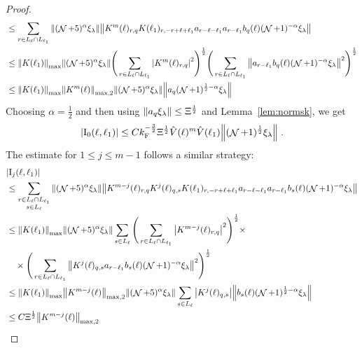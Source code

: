 \documentclass[12pt,a4paper]{article}
\numberwithin{equation}{section}
\newcommand{\1}{\mathbb{I}}
\newcommand{\F}{\mathrm{F}}
\newcommand{\I}{\mathrm{I}}
\DeclareMathOperator{\NN}{\mathcal{N}}
\newcommand{\half}{\frac{1}{2}}
\theoremstyle{plain}
\theoremstyle{definition}
\theoremstyle{remark}
\theoremstyle{plain}
\theoremstyle{definition}
\theoremstyle{remark}
\begin{document}
\begin{proof}
\begin{align}
	&\leq \sum\limits_{r\in L_{\ell} \cap L_{\ell_1}} \norm{  (\NN+5)^{\alpha} \xi_\lambda} \norm{ K^m(\ell )_{r,q} K(\ell_1)_{r,-r+\ell+\ell_1} a_{r-\ell-\ell_1} a_{r-\ell_1} b_{q}(\ell) (\NN+1)^{-\alpha} \xi_\lambda }\nonumber\\
	 &\leq \norm{K(\ell_1) }_{\max} \norm{  (\NN+5)^{\alpha} \xi_\lambda} \Bigg( \sum\limits_{r\in L_{\ell} \cap L_{\ell_1}}  \abs{ K^m(\ell)_{r,q}}^2 \Bigg)^\half \Bigg( \sum\limits_{r\in L_{\ell} \cap L_{\ell_1}} \norm{ a_{r-\ell_1} b_{q}(\ell) (\NN+1)^{-\alpha} \xi_\lambda }^2 \Bigg)^\half \nonumber\\
	 &\leq \norm{K(\ell_1) }_{\max}   \norm{ K^m(\ell)}_{\mathrm{max,2}} \norm{(\NN+5)^{\alpha} \xi_\lambda} \norm{ a_q (\NN+1)^{\half-\alpha} \xi_\lambda } \nonumber\\
\end{align}
Choosing $ \alpha = \half $ and then using $ \norm{ a_q \xi_\lambda} \le \Xi^\half $ and Lemma~\ref{lem:normsk}, we get
\begin{equation}
	|\I_0(\ell, \ell_1)|
	\leq C k_{\F}^{-\frac 32} \Xi^\half
		\hat{V}(\ell)^m
		\hat{V}(\ell_1)
		\norm{(\NN+1)^\half \xi_\lambda} \;. \label{eq:estEQ1121}
\end{equation} 
The estimate for $ 1 \le j \le m-1 $ follows a similar strategy:
\begin{align}
	&|\I_j(\ell, \ell_1)| \nonumber\\
	&\leq \sum\limits_{\substack{r\in L_{\ell} \cap L_{\ell_1}\\s\in L_{\ell}}} \norm{  (\NN+5)^{\alpha} \xi_\lambda}\norm{  K^{m-j}(\ell)_{r,q} K^{j}(\ell)_{q,s} K(\ell_1)_{r,-r+\ell+\ell_1} a_{r-\ell-\ell_1} a_{r-\ell_1} b_{s}(\ell)  (\NN+1)^{-\alpha} \xi_\lambda }\nonumber\\
	&\leq \norm{K(\ell_1)}_{\max} \norm{ (\NN+5)^{\alpha} \xi_\lambda} 
	\sum\limits_{s\in L_{\ell}} 
		\Bigg(\sum\limits_{r\in L_{\ell} \cap L_{\ell_1}}\abs{K^{m-j}(\ell)_{r,q} }^2\Bigg)^\half \times\nonumber\\ 
	&\quad \times\Bigg( \sum\limits_{r\in L_{\ell} \cap L_{\ell_1}}\norm{K^{j}(\ell)_{q,s} a_{r-\ell_1} b_{s}(\ell)  (\NN+1)^{-\alpha} \xi_\lambda }^2 \Bigg)^\half \nonumber\\
	&\leq \norm{K(\ell_1)}_{\max} \norm{K^{m-j}(\ell)}_{\mathrm{max,2}} \norm{ (\NN+5)^{\alpha} \xi_\lambda} \sum\limits_{s\in L_{\ell}}\abs{K^{j}(\ell)_{q,s}}
		\norm{  b_{s}(\ell)  (\NN+1)^{\half-\alpha} \xi_\lambda }		
	\nonumber\\
	&\leq C \Xi^\half
		\norm{K^{m-j}(\ell)}_{\mathrm{max,2}}

\end{align}
\end{proof}
\end{document}
